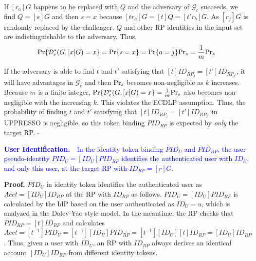 If $[r_a]G$ happens to be replaced with $Q$ and the adversary of $\mathcal{G}_c$ succeeds,
    we find $Q = [s]G$ and then $s=x$ because $[tr_a]G = [t]Q = [t'r_b]G$.
As $[r_j]G$ is randomly replaced by the challenger,
    $Q$ and other RP identities in the input set are indistinguishable to the adversary.
Thus,
\begin{equation*}
{\rm Pr}\{\mathcal{D}^*_c(G, [x]G)=x\} = {\rm Pr}\{s = x\}={\rm Pr}\{a=j\}{\rm Pr}_s=\frac{1}{m}{\rm Pr}_s
\end{equation*}

If the adversary is able to find $t$ and $t'$
    satisfying that $[t]ID_{RP_j} = [t']ID_{RP_{j'}}$,
    it will have advantages in $\mathcal{G}_c$
        and then
         ${\rm Pr}_s$ becomes non-negligible as $k$ increases.
Because $m$ is a finite integer, ${\rm Pr}\{\mathcal{D}^*_c(G, [x]G)=x\} = \frac{1}{m}{\rm Pr}_s$ also
becomes non-negligible with the increasing $k$.
This violates the ECDLP assumption.
Thus, the probability of finding $t$ and $t'$ satisfying that $[t]ID_{RP_j} = [t']ID_{RP_{j'}}$ in UPPRESSO is negligible,
    so this token binding $PID_{RP}$
     is expected by \emph{only} the target RP.
$\square$


\vspace{1mm}
\noindent\textcolor{blue}{\textbf{User Identification.}~~In the identity token
    binding $PID_U$ and $PID_{RP}$,
the user pseudo-identity $PID_U = [ID_U]PID_{RP}$ identifies
        the authenticated user with $ID_U$, %
         and only this user,  at the target RP with $ID_{RP} = [r]G$.}

\vspace{0.75mm}
\noindent\textbf{Proof.}
$PID_U$ in identity token identifies the authenticated user as $Acct = [ID_U]ID_{RP}$
    at the RP with $ID_{RP}$ as follows.
$PID_U = [ID_U]PID_{RP}$ is calculated by the IdP based on the user authenticated as $ID_U = u$,
    which is analyzed in the Dolev-Yao style model.
In the meantime, the  RP checks that $PID_{RP} = [t]ID_{RP}$
    and calculates $Acct = [t^{-1}]PID_U = [t^{-1}][ID_U]PID_{RP} = [t^{-1}][ID_U][t]ID_{RP} = [ID_U]ID_{RP}$.
Thus, given a user with $ID_U$, an RP with $ID_{RP}$ always derives an identical account
 $[ID_U]ID_{RP}$ from different identity tokens. %

